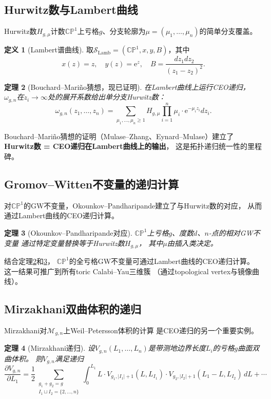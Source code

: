 \documentclass[11pt,a4paper]{article}
\theoremstyle{plain}
\newtheorem{theorem}{定理}[section]
\theoremstyle{definition}
\newtheorem{definition}[theorem]{定义}
\newcommand{\CP}{\mathbb{CP}}
\newcommand{\Mcal}{\mathcal{M}}
\newcommand{\ee}{\mathrm{e}}
\begin{document}
\subsection{Hurwitz数与Lambert曲线}

Hurwitz数$H_{g,\mu}$计数$\CP^1$上亏格$g$、分支轮廓为$\mu = (\mu_1, \ldots, \mu_n)$的简单分支覆盖。

\begin{definition}[Lambert谱曲线]\label{def:lambert}
取$\mathcal{S}_{\mathrm{Lamb}} = (\CP^1, x, y, B)$，其中
\[
x(z) = z, \quad y(z) = \ee^z, \quad B = \frac{dz_1 dz_2}{(z_1 - z_2)^2}.
\]
\end{definition}

\begin{theorem}[Bouchard--Mariño猜想，现已证明]\label{thm:BM}
在Lambert曲线上运行CEO递归，
$\omega_{g,n}$在$z_i \to \infty$处的展开系数给出单分支Hurwitz数：
\[
\omega_{g,n}(z_1, \ldots, z_n)
= \sum_{\mu_1, \ldots, \mu_n \geq 1}
H_{g,\mu} \prod_{i=1}^n \mu_i \cdot \ee^{-\mu_i z_i} dz_i.
\]
\end{theorem}

Bouchard--Mariño猜想的证明（Mulase--Zhang、Eynard--Mulase）建立了
\textbf{Hurwitz数 = CEO递归在Lambert曲线上的输出}，
这是拓扑递归统一性的里程碑。

\subsection{Gromov--Witten不变量的递归计算}

对$\CP^1$的GW不变量，Okounkov--Pandharipande建立了与Hurwitz数的对应，
从而通过Lambert曲线的CEO递归计算。

\begin{theorem}[Okounkov--Pandharipande对应]\label{thm:OP}
$\CP^1$上亏格$g$、度数$d$、$n$-点的相对GW不变量
通过特定变量替换等于Hurwitz数$H_{g,\mu}$，
其中$\mu$由插入类决定。
\end{theorem}

结合定理\ref{thm:BM}和\ref{thm:OP}，
$\CP^1$的全亏格GW不变量可通过Lambert曲线的CEO递归计算。
这一结果可推广到所有toric Calabi--Yau三维簇
（通过topological vertex与镜像曲线）。

\subsection{Mirzakhani双曲体积的递归}

Mirzakhani对$\Mcal_{g,n}$上Weil--Petersson体积的计算
是CEO递归的另一个重要实例。

\begin{theorem}[Mirzakhani递归]\label{thm:mirza}
设$V_{g,n}(L_1, \ldots, L_n)$是带测地边界长度$L_i$的亏格$g$曲面双曲体积。
则$V_{g,n}$满足递归
\begin{equation}\label{eq:mirza}
\frac{\partial V_{g,n}}{\partial L_1}
= \frac{1}{2} \sum_{\substack{g_1+g_2=g \\ I_1 \sqcup I_2 = \{2,\ldots,n\}}}
\int_0^{L_1} L \cdot V_{g_1, |I_1|+1}(L, L_{I_1}) \cdot V_{g_2, |I_2|+1}(L_1 - L, L_{I_2}) \, dL
+ \cdots
\end{equation}
\end{theorem}
\end{document}
